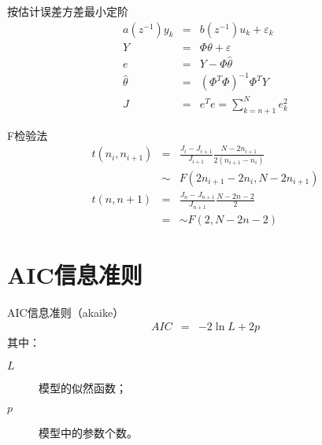 \begin{frame}{按估计误差方差最小定阶}
\begin{eqnarray*}
a(z^{-1})y_k &=& b(z^{-1})u_k+\varepsilon_k \\
Y &=& \Phi \theta + \varepsilon \\
e &=& Y-\Phi\hat\theta \\
\hat\theta &=& (\Phi^T\Phi)^{-1}\Phi^T Y \\
J &=& e^T e =\sum_{k=n+1}^N e_k^2
\end{eqnarray*}
\end{frame}

\begin{frame}{F检验法}
\begin{eqnarray*}
t(n_i,n_{i+1}) &=& \frac{J_i-J_{i+1}}{J_{i+1}}\frac{N-2n_{i+1}}{2(n_{i+1}-n_i)}\\
&\sim& F(2n_{i+1}-2n_i,N-2n_{i+1})\\
t(n,n+1) &=& \frac{J_n-J_{n+1}}{J_{n+1}}\frac{N-2n-2}{2}\\
&=& \sim F(2,N-2n-2)
\end{eqnarray*}
\end{frame}

\section{AIC信息准则}
\begin{frame}{AIC信息准则（akaike）}
\begin{eqnarray*}
AIC &=& -2\ln L + 2p
\end{eqnarray*}
其中：
\begin{description}
\item[$L$]模型的似然函数；
\item[$p$]模型中的参数个数。
\end{description}
\end{frame}

